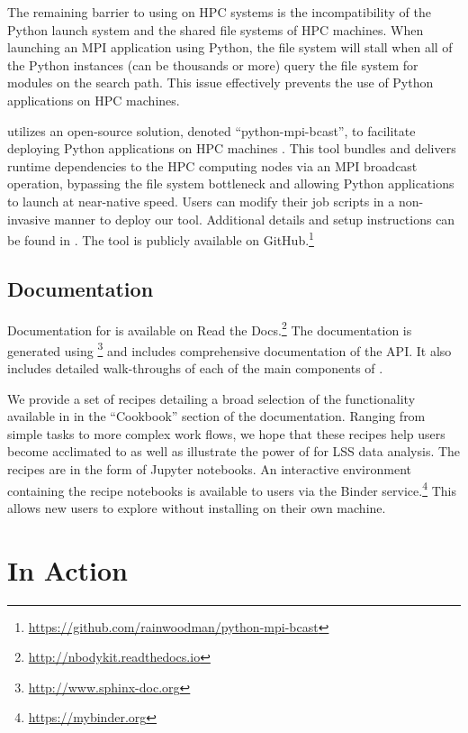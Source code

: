 The remaining barrier to using \nbkit{} on HPC systems is the incompatibility
of the Python launch system and the shared file systems of HPC machines.
When launching an MPI application using Python, the file system will stall
when all of the Python instances (can be thousands or more) query the
file system for modules on the search path. This issue effectively prevents
the use of Python applications on HPC machines.

\nbkit{} utilizes an open-source solution, denoted
``python-mpi-bcast'',
to facilitate deploying Python applications on HPC machines \citep{Feng:2016}.
This tool bundles and delivers
runtime dependencies to the HPC computing nodes via an MPI broadcast operation,
bypassing the file system bottleneck and allowing Python applications to launch
at near-native speed. Users can modify their job scripts
in a non-invasive manner to deploy our tool.
Additional details and setup instructions can be found in \citet{Feng:2016}.
The tool is publicly available on
GitHub.\footnote{\url{https://github.com/rainwoodman/python-mpi-bcast}}


\subsection{Documentation}

Documentation for \nbkit{} is available on
Read the Docs.\footnote{\url{http://nbodykit.readthedocs.io}} The documentation
is generated using \footnote{\url{http://www.sphinx-doc.org}}
and includes comprehensive documentation of the \nbkit{} API. It also includes
detailed walk-throughs of each of the main components of \nbkit{}.

We provide a set of recipes detailing a broad selection of the
functionality available in \nbkit{} in the ``Cookbook'' section of the
documentation. Ranging from simple tasks to more
complex work flows, we hope that these recipes help users become acclimated
to \nbkit{} as well as illustrate the power of \nbkit{} for LSS data analysis.
The recipes are in the form of Jupyter notebooks. An interactive environment
containing the recipe notebooks is available
to users via the Binder service.\footnote{\url{https://mybinder.org}}
This allows new users to explore \nbkit{} without
installing \nbkit{} on their own machine.


\section{In Action}
\label{sec:inaction}

